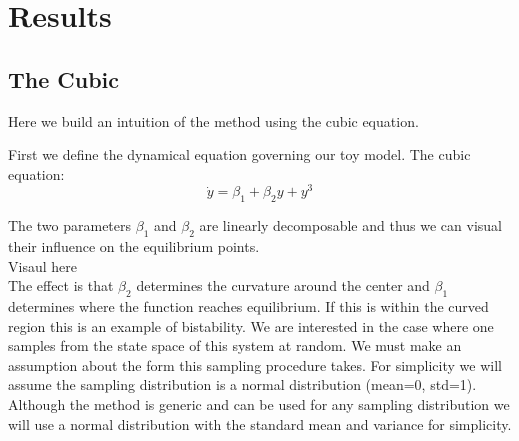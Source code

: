 \documentclass[12pt, a4paper]{article}
\begin{document}
\section {Results}
\subsection{The Cubic}
Here we build an intuition of the method using the cubic equation.

First we define the dynamical equation governing our toy model. The cubic equation:
\[
    \dot{y} = \beta_1 + \beta_2 y + y^3
\]

The two parameters $\beta_1$ and $\beta_2$ are linearly decomposable and thus
we can visual their influence on the equilibrium points.
\\Visaul here\\

The effect is that $\beta_2$ determines the curvature around the center
and $\beta_1$ determines where the function reaches equilibrium.
If this is within the curved region this is an example of bistability.
We are interested in the case where one samples from the state space of
this system at random. We must make an assumption about the form this sampling
procedure takes. For simplicity we will assume the sampling distribution is a 
normal distribution (mean=0, std=1). Although the method is generic and can
be used for any sampling distribution we will use a normal distribution with
the standard mean and variance for simplicity.
\end{document}
